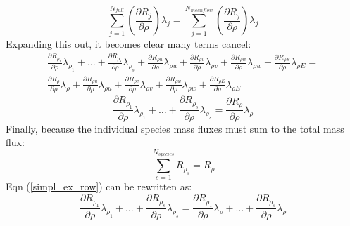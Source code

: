 \documentclass{article}   	%
\begin{document}
\begin{equation}
  \sum_{j=1}^{N_{full}}{
    \left(\frac{\partial R_j}{\partial \rho}\right) \lambda_j}
  = \sum_{j=1}^{N_{meanflow}}{
    \left(\frac{\partial R_j}{\partial \rho}\right) \lambda_j}
  \label{eq_mean_full}
\end{equation}
Expanding this out, it becomes clear many terms cancel:
\begin{multline}
  \frac{\partial R_{\rho_1}}{\partial \rho}\lambda_{\rho_1} +
  \dots +
  \frac{\partial R_{\rho_s}}{\partial \rho}\lambda_{\rho_s} +
  \frac{\partial R_{\rho u}}{\partial \rho}\lambda_{\rho u} +
  \frac{\partial R_{\rho v}}{\partial \rho}\lambda_{\rho v} +
  \frac{\partial R_{\rho w}}{\partial \rho}\lambda_{\rho w} +
  \frac{\partial R_{\rho E}}{\partial \rho}\lambda_{\rho E} = \\
  \frac{\partial R_{\rho}}{\partial \rho}\lambda_{\rho} +
  \frac{\partial R_{\rho u}}{\partial \rho}\lambda_{\rho u} +
  \frac{\partial R_{\rho v}}{\partial \rho}\lambda_{\rho v} +
  \frac{\partial R_{\rho w}}{\partial \rho}\lambda_{\rho w} +
  \frac{\partial R_{\rho E}}{\partial \rho}\lambda_{\rho E}
  \label{expand_row}
\end{multline}
\begin{equation}
  \frac{\partial R_{\rho_1}}{\partial \rho}\lambda_{\rho_1} +
  \dots +
  \frac{\partial R_{\rho_s}}{\partial \rho}\lambda_{\rho_s} =
  \frac{\partial R_{\rho}}{\partial \rho}\lambda_{\rho}
  \label{simpl_ex_row}
\end{equation}
Finally, because the individual species mass fluxes must sum to the total mass flux:
\begin{equation}
  \sum_{s=1}^{N_{species}}{R_{\rho_s}} = R_{\rho}
  \label{sp_sum}
\end{equation}
Eqn (\ref{simpl_ex_row}) can be rewritten as:
\begin{equation}
  \frac{\partial R_{\rho_1}}{\partial \rho}\lambda_{\rho_1} +
  \dots +
  \frac{\partial R_{\rho_s}}{\partial \rho}\lambda_{\rho_s} =
  \frac{\partial R_{\rho_1}}{\partial \rho}\lambda_{\rho} +
  \dots +
  \frac{\partial R_{\rho_s}}{\partial \rho}\lambda_{\rho}
  \label{near_final}
\end{equation}
\end{document}
